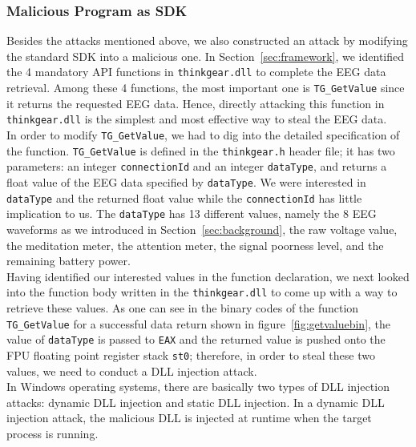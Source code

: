 \subsubsection{Malicious Program as SDK}
Besides the attacks mentioned above, we also constructed an attack by modifying the standard SDK into a malicious one. In Section~\ref{sec:framework}, we identified the 4 mandatory API functions in \texttt{thinkgear.dll} to complete the EEG data retrieval. Among these 4 functions, the most important one is \texttt{TG\_GetValue} since it returns the requested EEG data. Hence, directly attacking this function in \texttt{thinkgear.dll} is the simplest and most effective way to steal the EEG data. \\
%
\indent In order to modify \texttt{TG\_GetValue}, we had to dig into the detailed specification of the function. \texttt{TG\_GetValue} is defined in the \texttt{thinkgear.h} header file; it has two parameters: an integer \texttt{connectionId} and an integer \texttt{dataType}, and returns a float value of the EEG data specified by \texttt{dataType}. We were interested in \texttt{dataType} and the returned float value while the \texttt{connectionId} has little implication to us. The \texttt{dataType} has 13 different values, namely the 8 EEG waveforms as we introduced in Section~\ref{sec:background}, the raw voltage value, the meditation meter, the attention meter, the signal poorness level, and the remaining battery power.\\
%
\indent Having identified our interested values in the function declaration, we next looked into the function body written in the \texttt{thinkgear.dll} to come up with a way to retrieve these values. As one can see in the binary codes of the function \texttt{TG\_GetValue} for a successful data return shown in figure~\ref{fig:getvaluebin}, the value of \texttt{dataType} is passed to \texttt{EAX} and the returned value is pushed onto the FPU floating point register stack \texttt{st0}; therefore, in order to steal these two values, we need to conduct a DLL injection attack.\\
%
\indent In Windows operating systems, there are basically two types of DLL injection attacks: dynamic DLL injection and static DLL injection. In a dynamic DLL injection attack, the malicious DLL is injected at runtime when the target process is running. %
